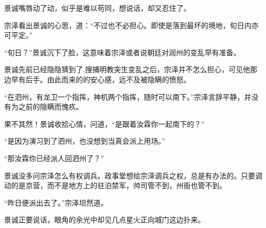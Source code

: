 景诚嘴唇动了动，似乎是难以苟同，想说话，却又忍住了。

宗泽看出景诚的心思，道：“不过也不必担心。即使是落到最坏的境地，旬日内亦可平定。”

“旬日？”景诚沉下了脸，这意味着宗泽或者说朝廷对润州的变乱早有准备。

景诚先前已经隐隐猜到了,搜捕明教突生变乱之后，宗泽并不怎么担心，可见他那边早有后手。由此而来的的安心感，远不及被隐瞒的愤怒。

“在泗州，有龙卫一个指挥，神机两个指挥，随时可以南下。”宗泽言辞平静，并没有为之前的隐瞒而愧疚。

果不其然！景诚收拾心情，问道，“是跟着汝霖你一起南下的？”

“是因为演习到了泗州，也没想到当真会派上用场。”

“那汝霖你已经派人回泗州了？”

景诚没多问宗泽怎么有权调兵。政事堂想给宗泽调兵之权，总是有办法的。只要调动的是京营，而不是地方上的驻泊禁军，帅司管不到，州衙也管不到。

“昨日便派出去了。”宗泽坦然道。

景诚正要说话，眼角的余光中却见几点星火正向城门这边扑来。

